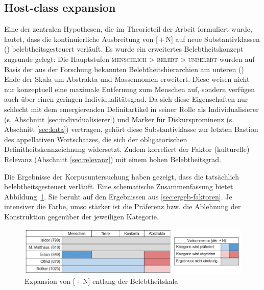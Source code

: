 \subsection{Host-class expansion}

Eine der zentralen Hypothesen, die im Theorieteil der Arbeit formuliert wurde, lautet, dass die kontinuierliche Ausbreitung von [\,+\,N] auf neue Substantivklassen () belebtheitsgesteuert verläuft. Es wurde ein erweitertes Belebtheitskonzept zugrunde gelegt: Die Hauptstufen \textsc{menschlich > belebt > unbelebt} wurden auf Basis der aus der Forschung bekannten Belebtheitshierarchien \parencite[u.a.][]{Comrie1989,Yamamoto1999,Croft2006,Enger2011} am unteren () Ende der Skala um Abstrakta und Massennomen erweitert. Diese weisen nicht nur konzeptuell eine maximale Entfernung zum Menschen auf, sondern verfügen auch über einen geringen Individualitätsgrad. Da sich diese Eigenschaften nur schlecht mit dem emergierenden Definitartikel in seiner Rolle als Individualisierer (s. Abschnitt \ref{sec:individualisierer}) und Marker für Diskursprominenz (s. Abschnitt \ref{sec:kata}) vertragen, gehört diese Substantivklasse zur letzten Bastion des appellativen Wortschatzes, die sich der obligatorischen Definitheitskennzeichnung widersetzt. Zudem korreliert der Faktor (kulturelle) Relevanz (Abschnitt \ref{sec:relevanz}) mit einem hohen Belebtheitsgrad. 

Die Ergebnisse der Korpusuntersuchung haben gezeigt, dass die  tatsächlich belebtheitsgesteuert verläuft. Eine schematische Zusammenfassung bietet Abbildung~\ref{abb:expansion-belebtheit}. Sie beruht auf den Ergebnissen aus \ref{sec:ergeb-faktoren}. Je intensiver die Farbe, umso stärker ist die Präferenz bzw. die Ablehnung der Konstruktion gegenüber der jeweiligen Kategorie. 

\begin{figure}
\begin{center}
  \includegraphics[width=\textwidth]{images/belebtheitsexpansion-neu3.jpg}
\caption {Expansion von [\,+\,N] entlang der Belebtheitskala} 
\label{abb:expansion-belebtheit}
\end{center}
\end{figure} 
  
